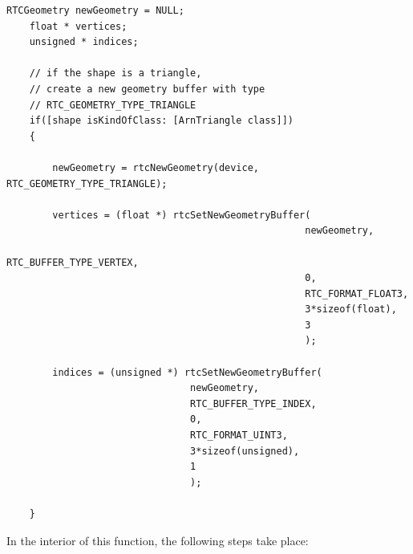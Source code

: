 \begin{listing} 
	\begin{lstlisting}[caption={Setting up geometry buffers for the vertices and indices of a triangle shape.}, label={lst:geometry_buffer}]
	RTCGeometry newGeometry = NULL;
	float * vertices;
	unsigned * indices;
	
	// if the shape is a triangle, 
	// create a new geometry buffer with type
	// RTC_GEOMETRY_TYPE_TRIANGLE
	if([shape isKindOfClass: [ArnTriangle class]]) 
	{
	
		newGeometry = rtcNewGeometry(device, RTC_GEOMETRY_TYPE_TRIANGLE);
		
		vertices = (float *) rtcSetNewGeometryBuffer(
													newGeometry,
													RTC_BUFFER_TYPE_VERTEX,
													0,
													RTC_FORMAT_FLOAT3,
													3*sizeof(float),
													3
													);
		
		indices = (unsigned *) rtcSetNewGeometryBuffer(
		                        newGeometry,
		                        RTC_BUFFER_TYPE_INDEX,
		                        0,
		                        RTC_FORMAT_UINT3,
		                        3*sizeof(unsigned),
		                        1
		                        );
	
	}
	\end{lstlisting}
\end{listing}


In the interior of this function, the following steps take place:

